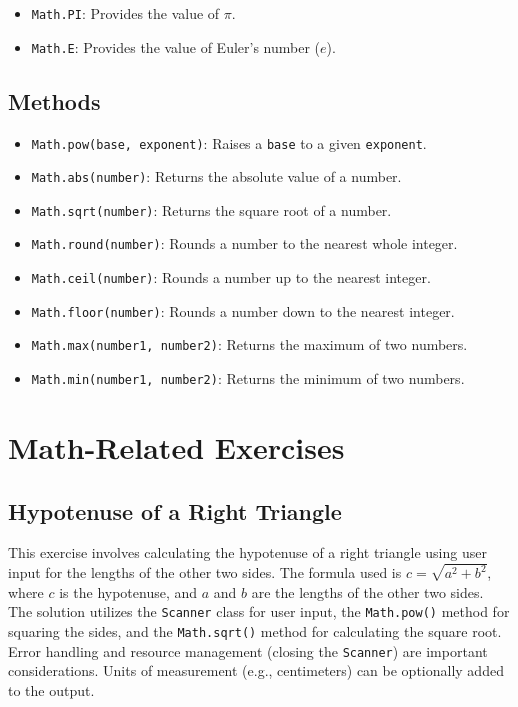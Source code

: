 \documentclass{article}
\begin{document}
\begin{itemize}
    \item \texttt{Math.PI}:  Provides the value of $\pi$.
    \item \texttt{Math.E}: Provides the value of Euler's number ($e$).
\end{itemize}

\subsection{Methods}

\begin{itemize}
    \item \texttt{Math.pow(base, exponent)}: Raises a \texttt{base} to a given \texttt{exponent}.
    \item \texttt{Math.abs(number)}: Returns the absolute value of a number.
    \item \texttt{Math.sqrt(number)}: Returns the square root of a number.
    \item \texttt{Math.round(number)}: Rounds a number to the nearest whole integer.
    \item \texttt{Math.ceil(number)}: Rounds a number up to the nearest integer.
    \item \texttt{Math.floor(number)}: Rounds a number down to the nearest integer.
    \item \texttt{Math.max(number1, number2)}: Returns the maximum of two numbers.
    \item \texttt{Math.min(number1, number2)}: Returns the minimum of two numbers.
\end{itemize}

\section{Math-Related Exercises}

\subsection{Hypotenuse of a Right Triangle}

This exercise involves calculating the hypotenuse of a right triangle using user input for the lengths of the other two sides.  The formula used is $c = \sqrt{a^2 + b^2}$, where $c$ is the hypotenuse, and $a$ and $b$ are the lengths of the other two sides. The solution utilizes the \texttt{Scanner} class for user input, the \texttt{Math.pow()} method for squaring the sides, and the \texttt{Math.sqrt()} method for calculating the square root.  Error handling and resource management (closing the \texttt{Scanner}) are important considerations.  Units of measurement (e.g., centimeters) can be optionally added to the output.
\end{document}

